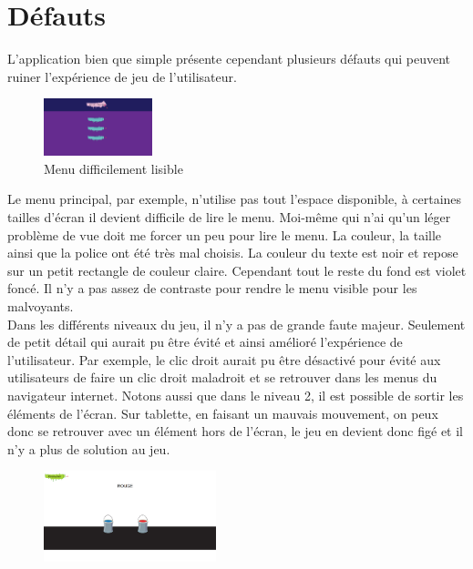 \documentclass{article}
\begin{document}
\section{Défauts}

L'application bien que simple présente cependant plusieurs défauts qui peuvent ruiner l'expérience de jeu de l'utilisateur.

\begin{figure}
  \vspace{-20pt}
  \begin{center}
    \includegraphics[width=0.28\textwidth]{2}
  \end{center}
  \vspace{-20pt}
  \caption{Menu difficilement lisible}
  \vspace{-10pt}
\end{figure}

Le menu principal, par exemple, n'utilise pas tout l'espace disponible, à certaines tailles d'écran il devient difficile de lire le menu. Moi-même qui n'ai qu'un léger problème de vue doit me forcer un peu pour lire le menu. La couleur, la taille ainsi que la police ont été très mal choisis. La couleur du texte est noir et repose sur un petit rectangle de couleur claire. Cependant tout le reste du fond est violet foncé. Il n'y a pas assez de contraste pour rendre le menu visible pour les malvoyants.\hfill\\

Dans les différents niveaux du jeu, il n'y a pas de grande faute majeur. Seulement de petit détail qui aurait pu être évité et ainsi amélioré l'expérience de l'utilisateur. Par exemple, le clic droit aurait pu être désactivé pour évité aux utilisateurs de faire un clic droit maladroit et se retrouver dans les menus du navigateur internet. Notons aussi que dans le niveau 2, il est possible de sortir les éléments de l'écran. Sur tablette, en faisant un mauvais mouvement, on peux donc se retrouver avec un élément hors de l'écran, le jeu en devient donc figé et il n'y a plus de solution au jeu.\\

\begin{figure}
\vspace{6pt}
\centering
\includegraphics[width=5cm]{6}
\end{figure}
\end{document}
